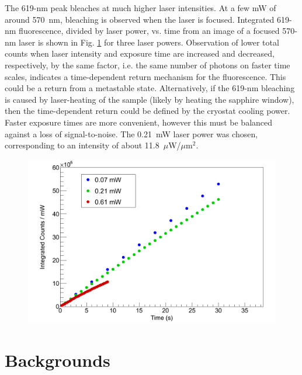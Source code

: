 The 619-nm peak bleaches at much higher laser intensities.  At a few mW of around 570~nm, bleaching is observed when the laser is focused.  Integrated 619-nm fluorescence, divided by laser power, vs. time from an image of a focused 570-nm laser is shown in Fig. \ref{fig:bleaching619} for three laser powers.  Observation of lower total counts when laser intensity and exposure time are increased and decreased, respectively, by the same factor, i.e. the same number of photons on faster time scales, indicates a time-dependent return mechanism for the fluorescence.  This could be a return from a metastable state.  Alternatively, if the 619-nm bleaching is caused by laser-heating of the sample (likely by heating the sapphire window), then the time-dependent return could be defined by the cryostat cooling power.  Faster exposure times are more convenient, however this must be balanced against a loss of signal-to-noise.  The 0.21~mW laser power was chosen, corresponding to an intensity of about 11.8~$\mu$W/$\mu$m$^{2}$.

\begin{figure} %
        \centering
                \includegraphics[width=.7\textwidth]{figures/619_bleach_summed_per_mW.png}
                \caption{}
\label{fig:bleaching619}
\end{figure}


\section{Backgrounds}
\label{sec:bgs}

